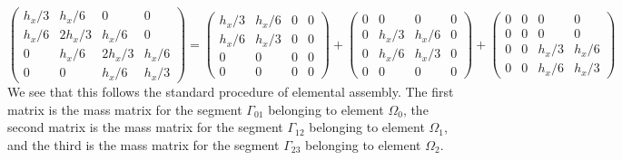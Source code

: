 \[
\left(
\begin{array}{cccc}
h_x/3 & h_x/6  &  0 & 0\\
h_x/6 & 2h_x/3  & h_x/6  & 0\\
0 & h_x/6  & 2h_x/3  & h_x/6 \\ 
0 & 0  &  h_x/6 & h_x/3
\end{array}
\right)
=
\left(
\begin{array}{cccc}
h_x/3 & h_x/6  &  0 & 0\\
h_x/6 & h_x/3  & 0  & 0\\
0 & 0  & 0  & 0 \\ 
0 & 0  &  0 & 0
\end{array}
\right)
+
\left(
\begin{array}{cccc}
0 & 0  &  0 & 0\\
0 & h_x/3  & h_x/6  & 0\\
0 & h_x/6  & h_x/3  & 0 \\ 
0 & 0  &  0 & 0
\end{array}
\right)
+
\left(
\begin{array}{cccc}
0 & 0  &  0 & 0\\
0 & 0  & 0 & 0\\
0 & 0 & h_x/3  & h_x/6 \\ 
0 & 0  &  h_x/6 & h_x/3
\end{array}
\right)
\]
We see that this follows the standard procedure of elemental assembly.
The first matrix is the mass matrix for the segment $\Gamma_{01}$ belonging to element $\Omega_0$,
the second matrix is the mass matrix for the segment $\Gamma_{12}$ belonging to element $\Omega_1$,
and the third is the mass matrix for the segment $\Gamma_{23}$ belonging to element $\Omega_2$.

